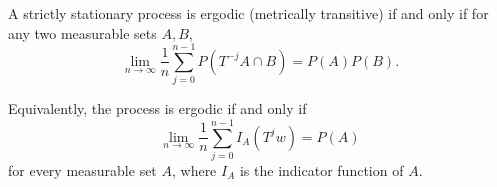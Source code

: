 A strictly stationary process is ergodic (metrically transitive) if and only if for any two measurable sets $A, B$,
$$\lim_{n \to \infty} \frac{1}{n} \sum_{j=0}^{n-1} P(T^{-j}A \cap B) = P(A) P(B).$$

Equivalently, the process is ergodic if and only if
$$\lim_{n \to \infty} \frac{1}{n} \sum_{j=0}^{n-1} I_A(T^j w) = P(A)$$
for every measurable set $A$, where $I_A$ is the indicator function of $A$.
